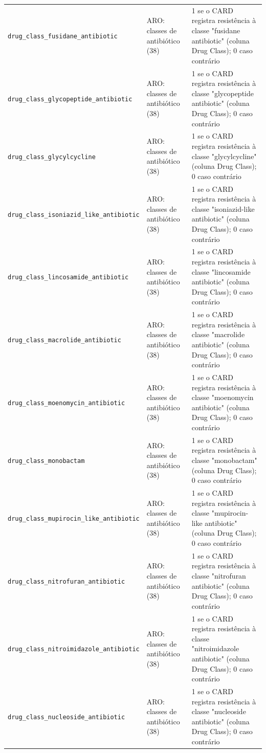 \begin{longtable}{p{4.2cm}p{2.6cm}p{8cm}}
  \texttt{drug\_class\_fusidane\_antibiotic} & ARO: classes de antibiótico (38) & 1 se o CARD registra resistência à classe "fusidane antibiotic" (coluna Drug Class); 0 caso contrário \\
  \texttt{drug\_class\_glycopeptide\_antibiotic} & ARO: classes de antibiótico (38) & 1 se o CARD registra resistência à classe "glycopeptide antibiotic" (coluna Drug Class); 0 caso contrário \\
  \texttt{drug\_class\_glycylcycline} & ARO: classes de antibiótico (38) & 1 se o CARD registra resistência à classe "glycylcycline" (coluna Drug Class); 0 caso contrário \\
  \texttt{drug\_class\_isoniazid\_like\_antibiotic} & ARO: classes de antibiótico (38) & 1 se o CARD registra resistência à classe "isoniazid-like antibiotic" (coluna Drug Class); 0 caso contrário \\
  \texttt{drug\_class\_lincosamide\_antibiotic} & ARO: classes de antibiótico (38) & 1 se o CARD registra resistência à classe "lincosamide antibiotic" (coluna Drug Class); 0 caso contrário \\
  \texttt{drug\_class\_macrolide\_antibiotic} & ARO: classes de antibiótico (38) & 1 se o CARD registra resistência à classe "macrolide antibiotic" (coluna Drug Class); 0 caso contrário \\
  \texttt{drug\_class\_moenomycin\_antibiotic} & ARO: classes de antibiótico (38) & 1 se o CARD registra resistência à classe "moenomycin antibiotic" (coluna Drug Class); 0 caso contrário \\
  \texttt{drug\_class\_monobactam} & ARO: classes de antibiótico (38) & 1 se o CARD registra resistência à classe "monobactam" (coluna Drug Class); 0 caso contrário \\
  \texttt{drug\_class\_mupirocin\_like\_antibiotic} & ARO: classes de antibiótico (38) & 1 se o CARD registra resistência à classe "mupirocin-like antibiotic" (coluna Drug Class); 0 caso contrário \\
  \texttt{drug\_class\_nitrofuran\_antibiotic} & ARO: classes de antibiótico (38) & 1 se o CARD registra resistência à classe "nitrofuran antibiotic" (coluna Drug Class); 0 caso contrário \\
  \texttt{drug\_class\_nitroimidazole\_antibiotic} & ARO: classes de antibiótico (38) & 1 se o CARD registra resistência à classe "nitroimidazole antibiotic" (coluna Drug Class); 0 caso contrário \\
  \texttt{drug\_class\_nucleoside\_antibiotic} & ARO: classes de antibiótico (38) & 1 se o CARD registra resistência à classe "nucleoside antibiotic" (coluna Drug Class); 0 caso contrário \\

\end{longtable}
